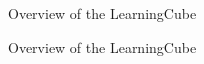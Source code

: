 \documentclass[letterpaper, 10 pt, conference]{ieeeconf}  %
\begin{document}
\begin{figure}[htpb]
      \centering
        \caption{Overview of the LearningCube}
        \label{fig:cube}
\end{figure}
\blindtext[2]
\begin{figure}[htpb]
      \centering
        \caption{Overview of the LearningCube}
        \label{fig:cube}
\end{figure}
\end{document}
